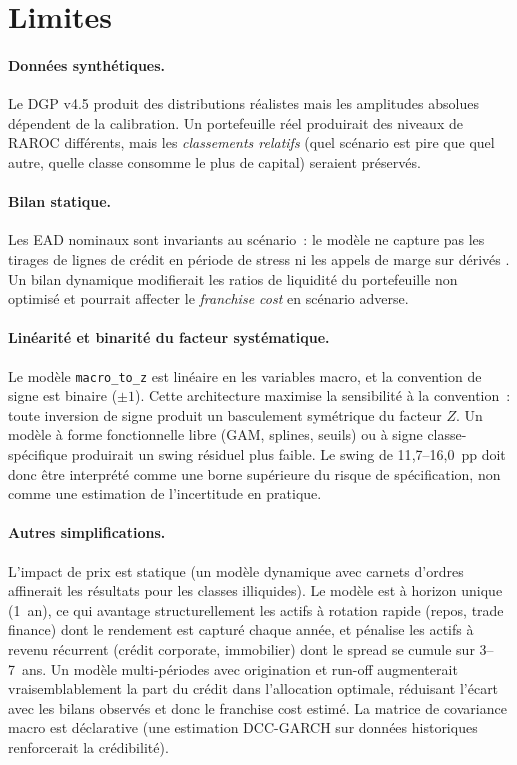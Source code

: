 \documentclass[10pt, a4paper, oneside]{report}
\theoremstyle{definition}
\begin{document}
\section*{Limites}

\paragraph{Données synthétiques.} Le DGP v4.5 produit des distributions réalistes mais les amplitudes absolues dépendent de la calibration. Un portefeuille réel produirait des niveaux de RAROC différents, mais les \emph{classements relatifs} (quel scénario est pire que quel autre, quelle classe consomme le plus de capital) seraient préservés.

\paragraph{Bilan statique.}
Les EAD nominaux sont invariants au scénario~: le modèle ne capture pas les tirages de lignes de crédit en période de stress ni les appels de marge sur dérivés \citep{ivashina_2010}. Un bilan dynamique modifierait les ratios de liquidité du portefeuille non optimisé et pourrait affecter le \emph{franchise cost} en scénario adverse.

\paragraph{Linéarité et binarité du facteur systématique.} Le modèle \texttt{macro\_to\_z} est linéaire en les variables macro, et la convention de signe est binaire ($\pm 1$). Cette architecture maximise la sensibilité à la convention~: toute inversion de signe produit un basculement symétrique du facteur $Z$. Un modèle à forme fonctionnelle libre (GAM, splines, seuils) ou à signe classe-spécifique produirait un swing résiduel plus faible. Le swing de 11{,}7--16{,}0~pp doit donc être interprété comme une borne supérieure du risque de spécification, non comme une estimation de l'incertitude en pratique.

\paragraph{Autres simplifications.} L'impact de prix est statique (un modèle dynamique avec carnets d'ordres affinerait les résultats pour les classes illiquides). Le modèle est à horizon unique (1~an), ce qui avantage structurellement les actifs à rotation rapide (repos, trade finance) dont le rendement est capturé chaque année, et pénalise les actifs à revenu récurrent (crédit corporate, immobilier) dont le spread se cumule sur 3--7~ans. Un modèle multi-périodes avec origination et run-off augmenterait vraisemblablement la part du crédit dans l'allocation optimale, réduisant l'écart avec les bilans observés et donc le franchise cost estimé. La matrice de covariance macro est déclarative (une estimation DCC-GARCH sur données historiques renforcerait la crédibilité).
\end{document}
